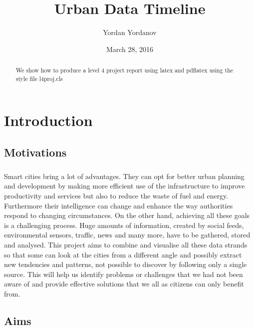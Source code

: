 \documentclass{l4proj}
\begin{document}
\title{Urban Data Timeline}
\author{Yordan Yordanov}
\date{March 28, 2016}
\maketitle

\begin{abstract}
We show how to produce a level 4 project report using latex and pdflatex using the 
style file l4proj.cls
\end{abstract}

\educationalconsent
%
%
\tableofcontents

\chapter{Introduction}

\section{Motivations}
\paragraph{}
Smart cities bring a lot of advantages. They can opt for better urban planning and development by making more efficient use of the infrastructure to improve productivity and services but also to reduce the waste of fuel and energy. Furthermore their intelligence can change and enhance the way authorities respond to changing circumstances. On the other hand, achieving all these goals is a challenging process. Huge amounts of information, created by social feeds, environmental sensors, traffic, news and many more, have to be gathered, stored and analysed. This project aims to combine and visualise all these data strands so that some can look at the cities from a different angle and possibly extract new tendencies and patterns, not possible to discover by following only a single source. This will help us identify problems or challenges that we had not been aware of and provide effective solutions that we all as citizens can only benefit from.

\section{Aims}
\label{sec:aims}
\end{document}
